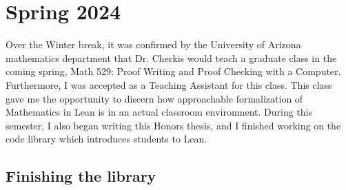 \section{Spring 2024}

Over the Winter break, it was confirmed by the University of Arizona
mathematics department that Dr. Cherkis would teach a graduate class
in the coming spring, Math 529: Proof Writing and Proof Checking with
a Computer. Furthermore, I was accepted as a Teaching Assistant for
this class. This class gave me the opportunity to discern how 
approachable formalization of Mathematics in Lean is in an actual
classroom environment. During this semester, I also began writing 
this Honors thesis, and I finished working on the code library
which introduces students to Lean. 

\subsection{Finishing the library}


